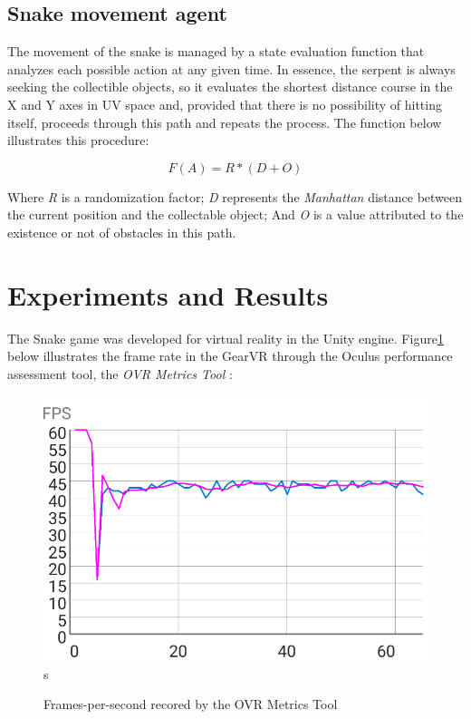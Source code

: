\documentclass[runningheads]{llncs}
\begin{document}
\subsection{Snake movement agent} \label{sec:agent}
The movement of the snake is managed by a state evaluation function that analyzes each possible action at any given time. In essence, the serpent is always seeking  the collectible objects, so it evaluates the shortest distance course in the X and Y axes in UV space and, provided that there is no possibility of hitting itself, proceeds through this path and repeats the process. The function below illustrates this procedure:

\begin{equation}
F(A) = R * (D + O)
\label{equation11}
\end{equation}

Where \textit{R} is a randomization factor; \textit{D} represents the \textit{Manhattan} distance between the current position and the collectable object; And \textit{O} is a value attributed to the existence or not of obstacles in this path.

\section{Experiments and Results} \label{sec:results}
The Snake game was developed for virtual reality in the Unity engine. Figure\ref{fig:VRPerformanceChart}  below illustrates the frame rate in the GearVR through the Oculus performance assessment tool, the \textit{OVR Metrics Tool} \cite{ovrmetrictool}:

\begin{figure}[h] 
\centering
\includegraphics[width=\textwidth]{src/hci2020-images/VRPerformance.png}s
\caption{Frames-per-second recored by the OVR Metrics Tool}
\label{fig:VRPerformanceChart}
\end{figure}
\end{document}
